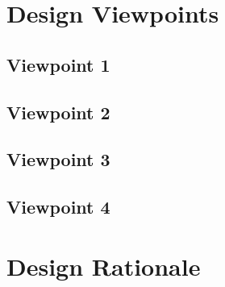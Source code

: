 \documentclass[draftclsnofoot,onecolumn,letterpaper,10pt]{IEEEtran}
\begin{document}
\section{Design Viewpoints}
\subsection{Viewpoint 1} %
\subsection{Viewpoint 2}
\subsection{Viewpoint 3}
\subsection{Viewpoint 4}

\section{Design Rationale}




\end{document}
